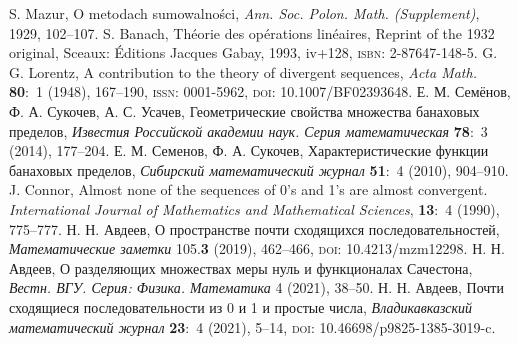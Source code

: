\documentclass[a4paper,14pt]{article}
\begin{document}
\small
\begin{thebibliography}{99}
	{}
	S. Mazur, O metodach sumowalno\'sci,
	\emph{Ann. Soc. Polon. Math. (Supplement)}, 1929, 102--107.
	{}
	S. Banach, Th\'eorie des op\'erations lin\'eaires, Reprint of the 1932 original, Sceaux: \'Editions Jacques Gabay,
	1993, iv+128, \textsc{isbn}: 2-87647-148-5.
	{}
	G. G. Lorentz, A contribution to the theory of divergent sequences, \emph{Acta Math.} \textbf{80}:~{1}
	(1948), 167--190, \textsc{issn}: 0001-5962, \textsc{doi}: {10.1007/BF02393648}.
	{}
	Е. М. Семёнов, Ф. А. Сукочев, А. С. Усачев, Геометрические свойства множества банаховых пределов,
	\emph{Известия Российской академии наук. Серия математическая} \textbf{78}:~{3} (2014), 177--204.
	{}
	Е. М. Семенов, Ф. А. Сукочев, Характеристические функции банаховых пределов, \emph{Сибирский
	математический журнал} \textbf{51}:~4 (2010), 904--910.
	{}
	J. Connor, Almost none of the sequences of 0’s and 1’s are almost
	convergent.
	\emph{International Journal of Mathematics and Mathematical Sciences}, \textbf{13}:~4 (1990), 775--777.
	{}
	Н. Н. Авдеев, О пространстве почти сходящихся последовательностей, \emph{Математические заметки}
	105.\textbf{3} (2019), 462--466, \textsc{doi}: {10.4213/mzm12298}.
	{}
	Н. Н. Авдеев, О разделяющих множествах меры нуль и функционалах Сачестона,
	\emph{Вестн. ВГУ. Серия: Физика. Математика} 4 (2021), 38--50.
	{}
	Н. Н. Авдеев, Почти сходящиеся последовательности из 0 и 1 и
	простые числа, \emph{Владикавказский математический журнал} {\bf 23}:~4 (2021), 5--14,
	\textsc{doi}: {10.46698/p9825-1385-3019-c}.
\end{thebibliography}
\normalsize
\end{document}
